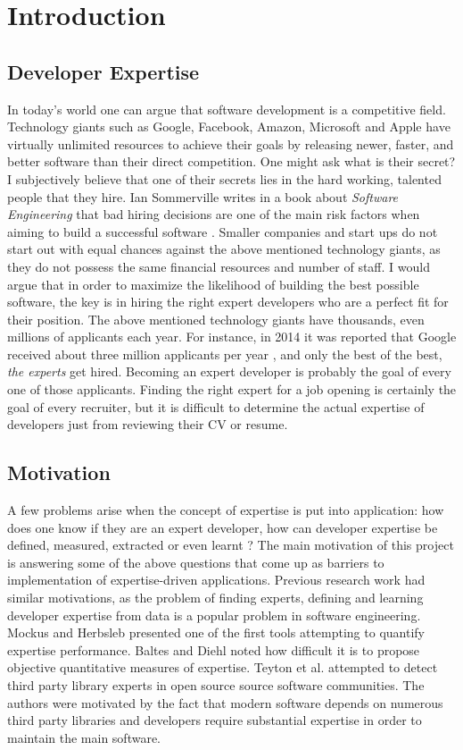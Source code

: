 \chapter{Introduction}

\section{Developer Expertise}

    In today's world one can argue that software development is a competitive field. Technology giants such as Google, Facebook, Amazon, Microsoft and Apple have virtually unlimited resources to achieve their goals by releasing newer, faster, and better software than their direct competition. One might ask what is their secret? I subjectively believe that one of their secrets lies in the hard working, talented people that they hire. Ian Sommerville writes in a book about \emph{Software Engineering} that bad hiring decisions are one of the main risk factors when aiming to build a successful software \cite{sommerville2016software}. Smaller companies and start ups do not start out with equal chances against the above mentioned technology giants, as they do not possess the same financial resources and number of staff. I would argue that in order to maximize the likelihood of building the best possible software, the key is in hiring the right expert developers who are a perfect fit for their position. The above mentioned technology giants have thousands, even millions of applicants each year. For instance, in 2014 it was reported that Google received about three million applicants per year \cite{nisen_2014}, and only the best of the best, \emph{the experts} get hired. Becoming an expert developer is probably the goal of every one of those applicants. Finding the right expert for a job opening is certainly the goal of every recruiter, but it is difficult to determine the actual expertise of developers just from reviewing their CV or resume.

\section{Motivation}
    A few problems arise when the concept of expertise is put into application: how does one know if they are an expert developer, how can developer expertise be defined, measured, extracted or even learnt ? The main motivation of this project is answering some of the above questions that come up as barriers to implementation of expertise-driven applications. Previous research work had similar motivations, as the problem of finding experts, defining and learning developer expertise from data is a popular problem in software engineering. Mockus and Herbsleb \cite{mockus2002expertise} presented one of the first tools attempting to quantify expertise performance. Baltes and Diehl \cite{baltes2018towards} noted how difficult it is to propose objective quantitative measures of expertise. Teyton et al. \cite{teyton2013find} attempted to detect third party library experts in open source source software communities. The authors were motivated by the fact that modern software depends on numerous third party libraries and developers require substantial expertise in order to maintain the main software.
    
